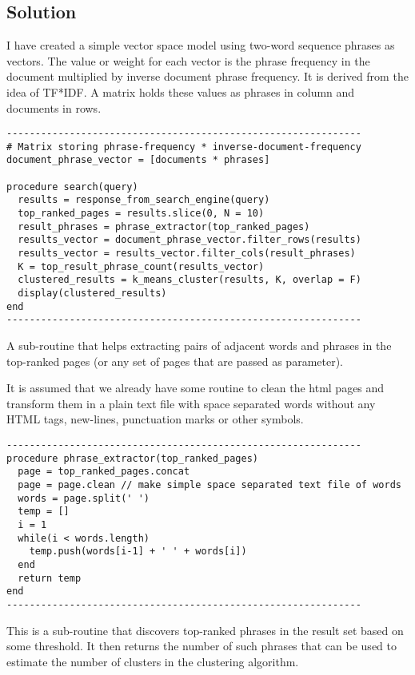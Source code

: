 \documentclass[letterpaper,12pt]{article}
\begin{document}
\subsection{Solution}

I have created a simple vector space model using two-word sequence phrases as vectors. The value or weight for each vector is the phrase frequency in the document multiplied by inverse document phrase frequency. It is derived from the idea of TF*IDF. A matrix holds these values as phrases in column and documents in rows.

\begin{verbatim}
--------------------------------------------------------------
# Matrix storing phrase-frequency * inverse-document-frequency
document_phrase_vector = [documents * phrases]

procedure search(query)
  results = response_from_search_engine(query)
  top_ranked_pages = results.slice(0, N = 10)
  result_phrases = phrase_extractor(top_ranked_pages)
  results_vector = document_phrase_vector.filter_rows(results)
  results_vector = results_vector.filter_cols(result_phrases)
  K = top_result_phrase_count(results_vector)
  clustered_results = k_means_cluster(results, K, overlap = F)
  display(clustered_results)
end
--------------------------------------------------------------
\end{verbatim}

A sub-routine that helps extracting pairs of adjacent words and phrases in the top-ranked pages (or any set of pages that are passed as parameter).

It is assumed that we already have some routine to clean the html pages and transform them in a plain text file with space separated words without any HTML tags, new-lines, punctuation marks or other symbols.

\begin{verbatim}
--------------------------------------------------------------
procedure phrase_extractor(top_ranked_pages)
  page = top_ranked_pages.concat
  page = page.clean // make simple space separated text file of words
  words = page.split(' ')
  temp = []
  i = 1
  while(i < words.length)
    temp.push(words[i-1] + ' ' + words[i])
  end
  return temp
end
--------------------------------------------------------------
\end{verbatim}

This is a sub-routine that discovers top-ranked phrases in the result set based on some threshold. It then returns the number of such phrases that can be used to estimate the number of clusters in the clustering algorithm.
\end{document}
